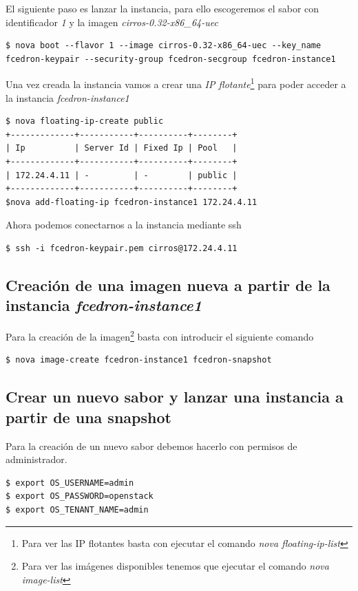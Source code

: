 \documentclass{article}
\begin{document}
	El siguiente paso es lanzar la instancia, para ello escogeremos el sabor con identificador \emph{1} y la imagen \emph{cirros-0.32-x86\_64-uec}
\begin{lstlisting}[style=miniBash]
$ nova boot --flavor 1 --image cirros-0.32-x86_64-uec --key_name fcedron-keypair --security-group fcedron-secgroup fcedron-instance1
\end{lstlisting}
	Una vez creada la instancia vamos a crear una \emph{IP flotante}\footnote{
Para ver las IP flotantes basta con ejecutar el comando \emph{nova floating-ip-list}
} para poder acceder a la instancia \emph{fcedron-instance1}
\begin{lstlisting}[style=miniBash]
$ nova floating-ip-create public
+-------------+-----------+----------+--------+
| Ip          | Server Id | Fixed Ip | Pool   |
+-------------+-----------+----------+--------+
| 172.24.4.11 | -         | -        | public |
+-------------+-----------+----------+--------+
$nova add-floating-ip fcedron-instance1 172.24.4.11
\end{lstlisting}

	Ahora podemos conectarnos a la instancia mediante ssh
\begin{lstlisting}[style=miniBash]
$ ssh -i fcedron-keypair.pem cirros@172.24.4.11
\end{lstlisting}

\subsection{Creación de una imagen nueva a partir de la instancia \emph{fcedron-instance1}}
	Para la creación de la imagen\footnote{
Para ver las imágenes disponibles tenemos que ejecutar el comando \emph{nova image-list}
} basta con introducir el siguiente comando
\begin{lstlisting}[style=miniBash]
$ nova image-create fcedron-instance1 fcedron-snapshot
\end{lstlisting}

\subsection{Crear un nuevo sabor y lanzar una instancia a partir de una snapshot}
	Para la creación de un nuevo sabor debemos hacerlo con permisos de administrador.
\begin{lstlisting}[style=miniBash]
$ export OS_USERNAME=admin
$ export OS_PASSWORD=openstack
$ export OS_TENANT_NAME=admin
\end{lstlisting}
\end{document}
